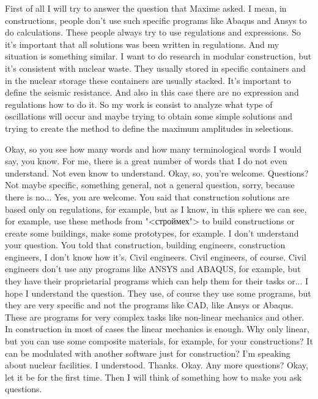 \documentclass[main.tex]{subfiles}
\begin{document}
First of all I will try to answer the question that Maxime asked.
I mean, in constructions, people don't use such specific programs like Abaqus and Ansys to do calculations.
These people always try to use regulations and expressions.
So it's important that all solutions was been written in regulations.
And my situation is something similar.
I want to do research in modular construction, but it's consistent with nuclear waste.
They usually stored in specific containers and in the nuclear storage these containers are usually stacked.
It's important to define the seismic resistance.
And also in this case there are no expression and regulations how to do it.
So my work is consist to analyze what type of oscillations will occur and maybe trying to obtain some simple solutions and trying to create the method to define the maximum amplitudes in selections.

Okay, so you see how many words and how many terminological words I would say, you know.
For me, there is a great number of words that I do not even understand.
Not even know to understand.
Okay, so, you're welcome.
Questions? Not maybe specific, something general, not a general question, sorry, because there is no...
Yes, you are welcome.
You said that construction solutions are based only on regulations, for example, but as I know, in this sphere we can see, for example, use these methods from "<строймех"> to build constructions or create some buildings, make some prototypes, for example.
I don't understand your question.
You told that construction, building engineers, construction engineers, I don't know how it's.
Civil engineers.
Civil engineers, of course.
Civil engineers don't use any programs like ANSYS and ABAQUS, for example, but they have their proprietarial programs which can help them for their tasks or...
I hope I understand the question.
They use, of course they use some programs, but they are very specific and not the programs like CAD, like Ansys or Abaqus.
These are programs for very complex tasks like non-linear mechanics and other.
In construction in most of cases the linear mechanics is enough.
Why only linear, but you can use some composite materials, for example, for your constructions?
It can be modulated with another software just for construction?
I'm speaking about nuclear facilities.
I understood.
Thanks.
Okay.
Any more questions?
Okay, let it be for the first time.
Then I will think of something how to make you ask questions.

\end{document}
